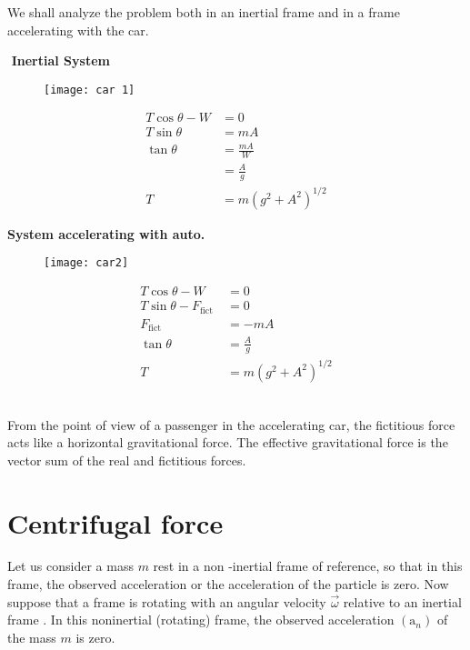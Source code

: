 \begin{answer}
	We shall analyze the problem both in an inertial frame and in a frame accelerating with the car.\\
	\begin{minipage}{0.45\textwidth}
		$\left. \right. $\\
	$\left. \right. $ \hspace{2cm}\textbf{Inertial System}
\begin{figure}[H]
	\centering
	\texttt{[image: car 1]}
\end{figure}
	\begin{align*}
	T \cos \theta-W &=0 \\
	T \sin \theta &=m A \\
	\tan \theta &=\frac{m A}{W}\\&=\frac{A}{g} \\
	T &=m\left(g^{2}+A^{2}\right)^{1 / 2}
	\end{align*}
	\end{minipage} \hfill
\begin{minipage}{0.45\textwidth}
		$\left. \right. $\\
\textbf{System accelerating with auto.}
\begin{figure}[H]
	\centering
	\texttt{[image: car2]}
\end{figure}
	\begin{align*}
	T \cos \theta-W &=0 \\
	T \sin \theta-F_{\text {fict }} &=0 \\
	F_{\text {fict }} &=-m A \\
	\tan \theta &=\frac{A}{g} \\
	T &=m\left(g^{2}+A^{2}\right)^{1 / 2}
	\end{align*}
\end{minipage}\\
From the point of view of a passenger in the accelerating car, the fictitious force acts like a horizontal gravitational force. The effective gravitational force is the vector sum of the real and fictitious forces.
\end{answer}
 
\section{Centrifugal force}
Let us consider a mass $m$ rest in  a non -inertial frame of reference, so that in this frame, the observed acceleration or the acceleration of the particle is zero. Now suppose that a frame is rotating with an angular velocity $\vec{\omega}$ relative to an inertial frame . In this noninertial (rotating) frame, the observed acceleration $\left(\mathrm{a}_{n}\right)$ of the mass $m$ is zero.\\

